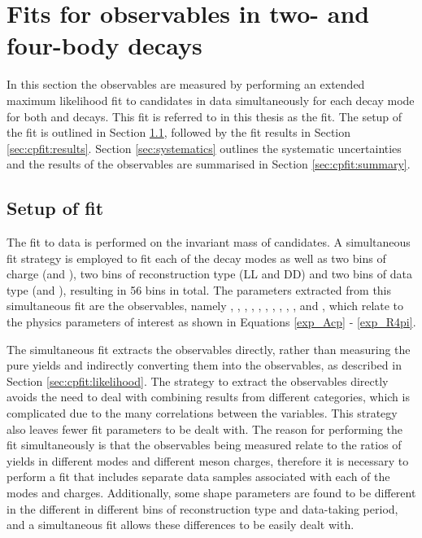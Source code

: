 \clearpage
%

\chapter{\label{ch:5-cpfit}Fits for \CP observables in two- and four-body decays} 


In this section the \CP observables are measured by performing an extended maximum likelihood fit to \btodkst candidates in data simultaneously for each \Dz decay mode for both \Bp and \Bm decays. This fit is referred to in this thesis as the \CP fit. The setup of the \CP fit is outlined in Section \ref{sec:cpfit:setup}, followed by the fit results in Section \ref{sec:cpfit:results}. Section \ref{sec:systematics} outlines the systematic uncertainties and the results of the \CP observables are summarised in Section \ref{sec:cpfit:summary}.

\section{Setup of \CP fit}
\label{sec:cpfit:setup}

The \CP fit to data is performed on the invariant mass of \btodkst candidates. A simultaneous fit strategy is employed to fit each of the \Dz decay modes as well as two bins of \B charge (\Bp and \Bm), two bins of \KS reconstruction type (LL and DD) and two bins of data type (\runone and \runtwo), resulting in 56 bins in total. The parameters extracted from this simultaneous fit are the \CP observables, namely \Akpi, \Akk, \Apipi, \Rkk, \Rpipi, \Rptwo, \Rmtwo, \Akpipipi, \Apipipipi, \Rpipipipi, \Rpfour and \Rmfour, which relate to the physics parameters of interest as shown in Equations \ref{exp_Acp} - \ref{exp_R4pi}.

The simultaneous fit extracts the \CP observables directly, rather than measuring the pure yields and indirectly converting them into the \CP observables, as described in Section \ref{sec:cpfit:likelihood}. The strategy to extract the \CP observables directly avoids the need to deal with combining results from different categories, which is complicated due to the many correlations between the variables. This strategy also leaves fewer fit parameters to be dealt with. The reason for performing the fit simultaneously is that the \CP observables being measured relate to the ratios of yields in different \Dz modes and different \B meson charges, therefore it is necessary to perform a fit that includes separate data samples associated with each of the modes and charges. Additionally, some shape parameters are found to be different in the different in different bins of \KS reconstruction type and data-taking period, and a simultaneous fit allows these differences to be easily dealt with. 

